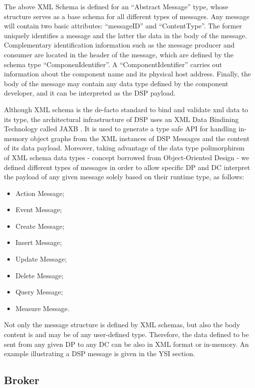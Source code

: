 \documentclass[conference]{IEEEtran}
\begin{document}
The above XML Schema is defined for an ``Abstract Message'' type, whose
structure serves as a base schema for all different types of messages. Any
message will contain two basic attributes: ``messageID'' and ``ContentType''. 
The former uniquely identifies a message and the latter the data in the body of
the message. Complementary identification information such as the message 
producer and consumer are located in the header of the message, which are
defined by the schema type ``ComponenIdentifier''. A ``ComponentIdentifier''
carries out information about the component name and its physical host address.
Finally, the body of the message may contain any data type defined by the component 
developer, and it can be interpreted as the DSP payload.

Although XML schema is the de-facto standard to bind and validate xml data to
its type, the architectural infrastructure of DSP uses an XML Data Bindining
Technology \cite{xml-dbind} called JAXB \cite{xml-jaxb}. It is used to generate
a type safe API for handling in-memory object graphs from the XML instances of 
DSP Messages and the content of its data payload. Moreover, taking advantage 
of the data type polimorphirsm of XML schema data types - concept borrowed from 
Object-Oriented Design \cite{Rumbaugh1991} - we defined different types of 
messages in order to allow specific DP and DC interpret the payload of any 
given message solely based on their runtime type, as follows:

\begin{itemize}
  \item Action Message;
  \item Event Message;
  \item Create Message;
  \item Insert Message;
  \item Update Message;
  \item Delete Message;
  \item Query Message;
  \item Measure Message.
\end{itemize}

Not only the message structure is defined by XML schemas, but also the body
content is and may be of any user-defined type. Therefore, the data
defined to be sent from any given DP to any DC can be also in XML format or
in-memory. An example illustrating a DSP message is given in the YSI section.

\subsection{Broker}
\end{document}
